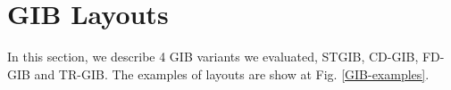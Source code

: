 \documentclass{llncs}
\begin{document}



%
\section{GIB Layouts}
%
In this section, we describe 4 GIB variants we evaluated, STGIB, CD-GIB, FD-GIB and TR-GIB.
The examples of layouts are show at Fig. \ref{GIB-examples}.
\end{document}
